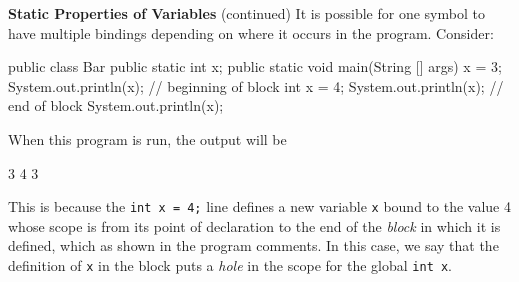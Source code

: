 \begin{minipage}[t]{\sw}
\slidenumber
\LARGE
{\bf Static Properties of Variables} (continued)\exx
\Large
It is possible for one symbol to have multiple bindings
depending on where it occurs in the program.
Consider:
{\Large
\begin{qv}
public class Bar {
  public static int x;
  public static void main(String [] args) {
    x = 3;
    System.out.println(x);
    { // beginning of block
      int x = 4;
      System.out.println(x);
    } // end of block
    System.out.println(x);
  }
}
\end{qv}
}
When this program is run, the output will be
\vspace{-0.75ex}
\begin{qv}
3
4
3
\end{qv}
\vspace{-0.75ex}
This is because the \verb'int x = 4;' line defines
a new variable \verb'x' bound to the value 4
whose scope is from its point of declaration
to the end of the {\em block} in which it is defined,
which as shown in the program comments.
In this case, we say that the definition of \verb'x' in the block
puts a {\em hole} in the scope for the global \verb'int x'.

\end{minipage}
\clearpage
